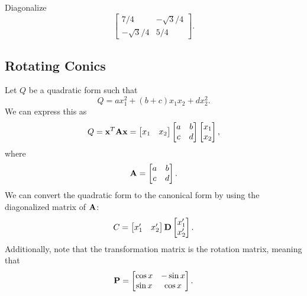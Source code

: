 \documentclass[12pt]{scrartcl}
\begin{document}
\begin{example}
    Diagonalize $$\begin{bmatrix} 7/4 & -\sqrt{3}/4 \\ -\sqrt{3}/4 & 5/4 \end{bmatrix}.$$
\end{example}

\subsection{Rotating Conics}
Let $Q$ be a quadratic form such that $$Q = ax_{1}^2+(b+c)x_1x_2+dx_2^2.$$
We can express this as $$Q = \bold{x}^T \bold{A}\bold{x} = \begin{bmatrix} x_1 & x_2 \end{bmatrix} \begin{bmatrix} a & b \\ c & d \end{bmatrix}
\begin{bmatrix} x_1 \\ x_2 \end{bmatrix},$$ where $$\bold{A} = \begin{bmatrix} a & b \\ c & d \end{bmatrix}.$$
We can convert the quadratic form to the canonical form by using the diagonalized matrix of $\bold{A}$:
$$C = \begin{bmatrix} x_1' & x_2' \end{bmatrix} \bold{D}
\begin{bmatrix} x_1' \\ x_2' \end{bmatrix}.$$ Additionally, note that the transformation matrix is the
rotation matrix, meaning that
$$\bold{P} = \begin{bmatrix} \cos x & -\sin x \\ \sin x & \cos x\end{bmatrix}.$$
\end{document}
